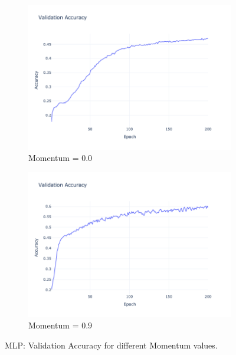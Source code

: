 \begin{figure}[htbp!]
    \centering
    \begin{subfigure}{0.45\textwidth}
        \centering
        \includegraphics[width=\textwidth]{images/mlp-validation-accuracy-batch-1024-lr-0.002-epochs-200-hidden-200-dropout-0.3-l2-0.0-layers-2-act-relu-opt-sgd-mom-0.0.png}
        \caption{Momentum = $0.0$}
    \end{subfigure}
    \begin{subfigure}{0.45\textwidth}
        \centering
        \includegraphics[width=\textwidth]{images/mlp-validation-accuracy-batch-1024-lr-0.002-epochs-200-hidden-200-dropout-0.3-l2-0.0-layers-2-act-relu-opt-sgd-mom-0.9.png}
        \caption{Momentum = $0.9$}
    \end{subfigure}
    \caption{MLP: Validation Accuracy for different Momentum values.}
    \label{fig:mlp_momentum_acc}
\end{figure}


